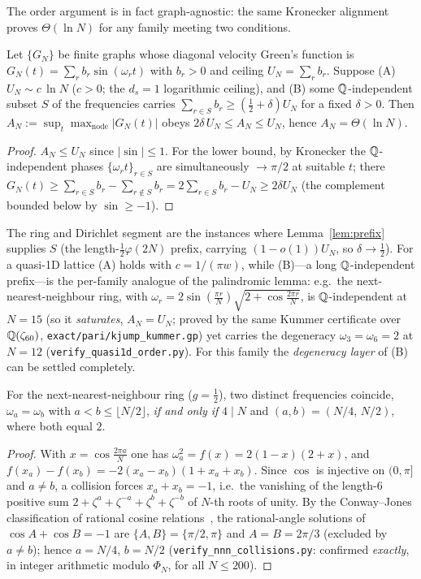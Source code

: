The order argument is in fact graph-agnostic: the same Kronecker alignment proves $\Theta(\ln N)$ for any
family meeting two conditions.

\begin{proposition}[order criterion at $d_s=1$]\label{prop:order-criterion}
Let $\{G_N\}$ be finite graphs whose diagonal velocity Green's function is
$G_N(t)=\sum_r b_r\sin(\omega_r t)$ with $b_r>0$ and ceiling $U_N=\sum_r b_r$. Suppose
\textup{(A)} $U_N\sim c\,\ln N$ ($c>0$; the $d_s=1$ logarithmic ceiling), and \textup{(B)} some
$\mathbb{Q}$-independent subset $S$ of the frequencies carries $\sum_{r\in S}b_r\ge(\tfrac12+\delta)U_N$ for a fixed
$\delta>0$. Then $A_N:=\sup_t\max_{\mathrm{node}}|G_N(t)|$ obeys $2\delta\,U_N\le A_N\le U_N$, hence
$A_N=\Theta(\ln N)$.
\end{proposition}

\begin{proof}
$A_N\le U_N$ since $|\sin|\le1$. For the lower bound, by Kronecker the $\mathbb{Q}$-independent phases
$\{\omega_r t\}_{r\in S}$ are simultaneously $\to\pi/2$ at suitable $t$; there $G_N(t)\ge\sum_{r\in S}b_r
-\sum_{r\notin S}b_r=2\sum_{r\in S}b_r-U_N\ge2\delta U_N$ (the complement bounded below by $\sin\ge-1$).
\end{proof}

\noindent The ring and Dirichlet segment are the instances where Lemma~\ref{lem:prefix} supplies $S$ (the
length-$\tfrac12\varphi(2N)$ prefix, carrying $(1-o(1))U_N$, so $\delta\to\tfrac12$). For a quasi-1D lattice
(A) holds with $c=1/(\pi w)$, while (B)---a long $\mathbb{Q}$-independent prefix---is the per-family analogue of the
palindromic lemma: e.g.\ the next-nearest-neighbour ring, with
$\omega_r=2\sin(\tfrac{\pi r}N)\sqrt{2+\cos\tfrac{2\pi r}N}$, is $\mathbb{Q}$-independent at $N=15$ (so it
\emph{saturates}, $A_N=U_N$; proved by the same Kummer certificate over $\mathbb{Q}(\zeta_{60})$,
\texttt{exact/pari/kjump\_kummer.gp}) yet carries the degeneracy $\omega_3=\omega_6=2$ at $N=12$
(\texttt{verify\_quasi1d\_order.py}). For this family the \emph{degeneracy layer} of (B) can be settled
completely.

\begin{proposition}\label{prop:nnn}
For the next-nearest-neighbour ring ($g=\tfrac12$), two distinct frequencies coincide,
$\omega_a=\omega_b$ with $a<b\le\lfloor N/2\rfloor$, \emph{if and only if} $4\mid N$ and
$(a,b)=(N/4,\,N/2)$, where both equal $2$.
\end{proposition}

\begin{proof}
With $x=\cos\tfrac{2\pi a}N$ one has $\omega_a^2=f(x)=2(1-x)(2+x)$, and
$f(x_a)-f(x_b)=-2(x_a-x_b)(1+x_a+x_b)$. Since $\cos$ is injective on $(0,\pi]$ and $a\ne b$, a collision
forces $x_a+x_b=-1$, i.e.\ the vanishing of the length-$6$ positive sum
$2+\zeta^a+\zeta^{-a}+\zeta^b+\zeta^{-b}$ of $N$-th roots of unity. By the Conway--Jones classification of
rational cosine relations~\cite{CJ}, the rational-angle solutions of $\cos A+\cos B=-1$ are
$\{A,B\}=\{\pi/2,\pi\}$ and $A=B=2\pi/3$ (excluded by $a\ne b$); hence $a=N/4$, $b=N/2$
(\texttt{verify\_nnn\_collisions.py}: confirmed \emph{exactly}, in integer arithmetic modulo $\Phi_N$, for
all $N\le200$). \end{proof}

